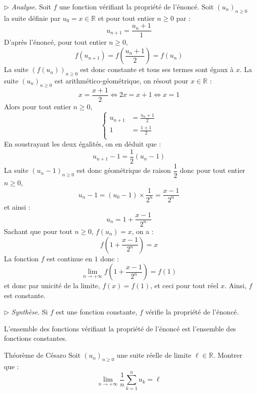 \documentclass[a4paper,10pt]{report}
\begin{document}
$\rhd$ \textit{Analyse}. Soit $f$ une fonction vérifiant la propriété de l'énoncé. Soit $(u_n)_{n \geq 0}$ la suite définie par $u_0=x \in \mathbb{R}$ et pour tout entier $n \geq 0$ par :
$$ u_{n+1} = \dfrac{u_n+1}{1}$$
D'après l'énoncé, pour tout entier $n \geq 0$,
$$ f(u_{n+1}) = f \left( \frac{u_n+1}{2} \right) = f(u_n)$$
La suite $(f(u_n))_{n \geq 0}$ est donc constante et tous ses termes sont égaux à $x$. La suite $(u_n)_{n \geq 0}$ est arithmético-géométrique, on résout pour $x \in \mathbb{R}$ : 
$$ x = \dfrac{x+1}{2} \Longleftrightarrow 2x=x+1 \Longleftrightarrow x=1$$
Alors pour tout entier $n \geq 0$,
$$ \left\lbrace \begin{array}{ccl}
u_{n+1} & =  \frac{u_n+1}{2}  \\[0.1cm]
1 & =  \frac{1+1}{2}  \\
\end{array}\right.$$
En soustrayant les deux égalités, on en déduit que :
$$u_{n+1}-1 = \dfrac{1}{2} (u_n-1)$$
La suite $(u_n-1)_{n \geq 0}$ est donc géométrique de raison $\dfrac{1}{2}$ donc pour tout entier $n \geq 0$,
$$ u_n - 1 = (u_0-1) \times \dfrac{1}{2^n} = \dfrac{x-1}{2^n}$$
et ainsi :
$$ u_n = 1 +  \dfrac{x-1}{2^n}$$
Sachant que pour tout $n \geq 0$, $f(u_n)=x$, on a :
$$ f \left( 1 +  \dfrac{x-1}{2^n} \right) = x$$
La fonction $f$ est continue en $1$ donc :
$$ \lim_{n \rightarrow + \infty}f \left( 1 +  \dfrac{x-1}{2^n} \right) = f(1)$$
et donc par unicité de la limite, $f(x)=f(1)$, et ceci pour tout réel $x$. Ainsi, $f$ est constante.

\medskip

\noindent $\rhd$ \textit{Synthèse}. Si $f$ est une fonction constante, $f$ vérifie la propriété de l'énoncé.

\medskip

\noindent L'ensemble des fonctions vérifiant la propriété de l'énoncé est l'ensemble des fonctions constantes.





\medskip

\begin{Exercice}{Théorème de Césaro} Soit $(u_n)_{n \geq 0}$ une suite réelle de limite $\ell \in \mathbb{R}$. Montrer que :
$$ \lim_{n \rightarrow + \infty} \frac{1}{n} \sum_{k=1}^n u_k = \ell$$
\end{Exercice}
\end{document}
